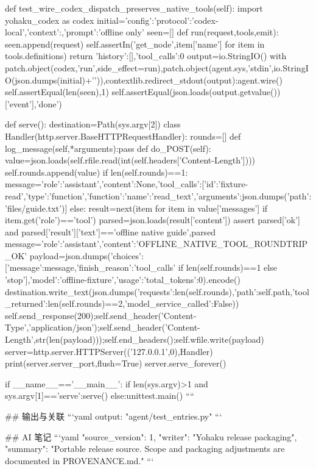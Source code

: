     def test_wire_codex_dispatch_preserves_native_tools(self):
        import yohaku_codex as codex
        initial={'config':{'protocol':'codex-local'},'context':{},'prompt':'offline only'}
        seen=[]
        def run(request,tools,emit):
            seen.append(request)
            self.assertIn('get_node',{item['name'] for item in tools.definitions})
            return {'history':[],'tool_calls':0}
        output=io.StringIO()
        with patch.object(codex,'run',side_effect=run),patch.object(agent.sys,'stdin',io.StringIO(json.dumps(initial)+'\n')),contextlib.redirect_stdout(output):agent.wire()
        self.assertEqual(len(seen),1)
        self.assertEqual(json.loads(output.getvalue())['event'],'done')


def serve():
    destination=Path(sys.argv[2])
    class Handler(http.server.BaseHTTPRequestHandler):
        rounds=[]
        def log_message(self,*arguments):pass
        def do_POST(self):
            value=json.loads(self.rfile.read(int(self.headers['Content-Length'])))
            self.rounds.append(value)
            if len(self.rounds)==1:
                message={'role':'assistant','content':None,'tool_calls':[{'id':'fixture-read','type':'function','function':{'name':'read_text','arguments':json.dumps({'path':'files/guide.txt'})}}]}
            else:
                result=next(item for item in value['messages'] if item.get('role')=='tool')
                parsed=json.loads(result['content'])
                assert parsed['ok'] and parsed['result']['text']=='offline native guide\n',parsed
                message={'role':'assistant','content':'OFFLINE_NATIVE_TOOL_ROUNDTRIP_OK'}
            payload=json.dumps({'choices':[{'message':message,'finish_reason':'tool_calls' if len(self.rounds)==1 else 'stop'}],'model':'offline-fixture','usage':{'total_tokens':0}}).encode()
            destination.write_text(json.dumps({'requests':len(self.rounds),'path':self.path,'tool_returned':len(self.rounds)==2,'model_service_called':False}))
            self.send_response(200);self.send_header('Content-Type','application/json');self.send_header('Content-Length',str(len(payload)));self.end_headers();self.wfile.write(payload)
    server=http.server.HTTPServer(('127.0.0.1',0),Handler)
    print(server.server_port,flush=True)
    server.serve_forever()


if __name__=='__main__':
    if len(sys.argv)>1 and sys.argv[1]=='serve':serve()
    else:unittest.main()
````

## 输出与关联
```yaml
output: "agent/test_entries.py"
```

## AI 笔记
```yaml
{"source_version": 1, "writer": "Yohaku release packaging", "summary": "Portable release source. Scope and packaging adjustments are documented in PROVENANCE.md."}
```
